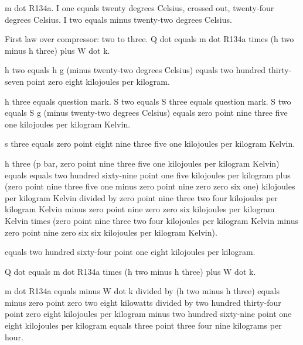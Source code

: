 m dot R134a. I one equals twenty degrees Celsius, crossed out, twenty-four degrees Celsius. I two equals minus twenty-two degrees Celsius.

First law over compressor: two to three. Q dot equals m dot R134a times (h two minus h three) plus W dot k.

h two equals h g (minus twenty-two degrees Celsius) equals two hundred thirty-seven point zero eight kilojoules per kilogram.

h three equals question mark. S two equals S three equals question mark. S two equals S g (minus twenty-two degrees Celsius) equals zero point nine three five one kilojoules per kilogram Kelvin.

s three equals zero point eight nine three five one kilojoules per kilogram Kelvin.

h three (p bar, zero point nine three five one kilojoules per kilogram Kelvin) equals equals two hundred sixty-nine point one five kilojoules per kilogram plus (zero point nine three five one minus zero point nine zero zero six one) kilojoules per kilogram Kelvin divided by zero point nine three two four kilojoules per kilogram Kelvin minus zero point nine zero zero six kilojoules per kilogram Kelvin times (zero point nine three two four kilojoules per kilogram Kelvin minus zero point nine zero six six kilojoules per kilogram Kelvin).

equals two hundred sixty-four point one eight kilojoules per kilogram.

Q dot equals m dot R134a times (h two minus h three) plus W dot k.

m dot R134a equals minus W dot k divided by (h two minus h three) equals minus zero point zero two eight kilowatts divided by two hundred thirty-four point zero eight kilojoules per kilogram minus two hundred sixty-nine point one eight kilojoules per kilogram equals three point three four nine kilograms per hour.